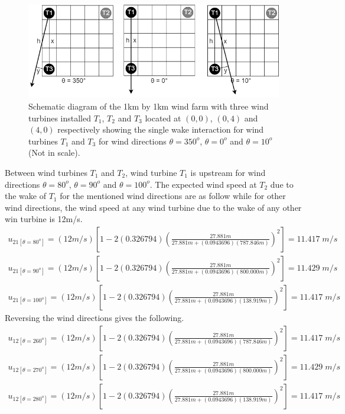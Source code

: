 	\begin{figure}[H]
	    \centering
	    \includegraphics[width=\linewidth]{Figures/schematicsBest3b.png}
	    \caption{Schematic diagram of the 1km by 1km wind farm with three wind turbines installed $T_1$, $T_2$ and $T_3$ located at $(0,0)$, $(0,4)$ and $(4,0)$ respectively showing the single wake interaction for wind turbines $T_1$ and $T_3$ for wind directions $\theta=350^o$, $\theta=0^o$ and $\theta=10^o$ (Not in scale).}
	    \label{schematicsBest3b}
	\end{figure}
	
	Between wind turbines $T_1$ and $T_2$, wind turbine $T_1$ is upstream for wind directions $\theta=80^o$, $\theta=90^o$ and $\theta=100^o$. The expected wind speed at $T_2$ due to the wake of $T_1$ for the mentioned wind directions are as follow while for other wind directions, the wind speed at any wind turbine due to the wake of any other win turbine is 12m/s.
	\begin{align*}
	    u_{21[\theta=80^o]} = (12m/s) \left[ 1-2(0.326794)\left( \frac{27.881m}{27.881m+(0.0943696) (787.846m)} \right)^2 \right] = 11.417\;m/s \\
	    u_{21[\theta=90^o]} = (12m/s) \left[ 1-2(0.326794)\left( \frac{27.881m}{27.881m+(0.0943696) (800.000m)} \right)^2 \right] = 11.429\;m/s \\
	    u_{21[\theta=100^o]} = (12m/s) \left[ 1-2(0.326794)\left( \frac{27.881m}{27.881m+(0.0943696) (138.919m)} \right)^2 \right] = 11.417\;m/s
	\end{align*}
	Reversing the wind directions gives the following.
	\begin{align*}
	    u_{12[\theta=260^o]} = (12m/s) \left[ 1-2(0.326794)\left( \frac{27.881m}{27.881m+(0.0943696) (787.846m)} \right)^2 \right] = 11.417\;m/s \\
	    u_{12[\theta=270^o]} = (12m/s) \left[ 1-2(0.326794)\left( \frac{27.881m}{27.881m+(0.0943696) (800.000m)} \right)^2 \right] = 11.429\;m/s \\
	    u_{12[\theta=280^o]} = (12m/s) \left[ 1-2(0.326794)\left( \frac{27.881m}{27.881m+(0.0943696) (138.919m)} \right)^2 \right] = 11.417\;m/s
	\end{align*}
	
